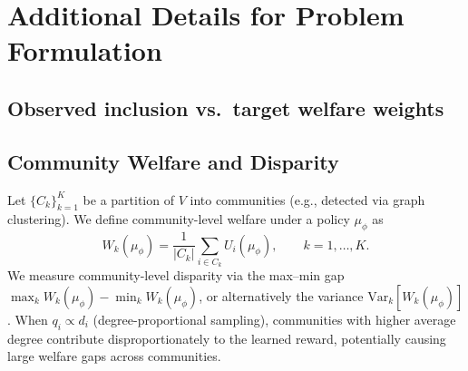 \documentclass{article}
\theoremstyle{plain}
\theoremstyle{definition}
\theoremstyle{remark}
\begin{document}
\section{Additional Details for Problem Formulation}
\label{app:problem-details}

\subsection{Observed inclusion vs.\ target welfare weights}
\label{app:q-vs-pi}
\begin{center}
\end{center}

\subsection{Community Welfare and Disparity}
\label{app:community-welfare}

Let $\{C_k\}_{k=1}^K$ be a partition of $V$ into communities (e.g., detected via graph clustering). We define community-level welfare under a policy $\mu_\phi$ as
\begin{equation}
    W_k(\mu_\phi)
    =
    \frac{1}{|C_k|}
    \sum_{i \in C_k} U_i(\mu_\phi),
    \qquad
    k = 1,\dots,K.
    \label{eq:community-welfare}
\end{equation}
We measure community-level disparity via the max--min gap $\max_k W_k(\mu_\phi) - \min_k W_k(\mu_\phi)$, or alternatively the variance $\mathrm{Var}_k[W_k(\mu_\phi)]$. When $q_i \propto d_i$ (degree-proportional sampling), communities with higher average degree contribute disproportionately to the learned reward, potentially causing large welfare gaps across communities.
\end{document}
